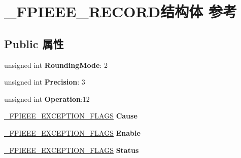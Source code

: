 \hypertarget{struct___f_p_i_e_e_e___r_e_c_o_r_d}{}\section{\+\_\+\+F\+P\+I\+E\+E\+E\+\_\+\+R\+E\+C\+O\+R\+D结构体 参考}
\label{struct___f_p_i_e_e_e___r_e_c_o_r_d}
\subsection*{Public 属性}
\begin{DoxyCompactItemize}
\item 
\mbox{\label{struct___f_p_i_e_e_e___r_e_c_o_r_d_ac12c23bab4db49dab0afd46d5b78eb63}} 
unsigned int {\bfseries Rounding\+Mode}\+: 2
\item 
\mbox{\label{struct___f_p_i_e_e_e___r_e_c_o_r_d_aa8602eb95392de3eef8529afe92adc11}} 
unsigned int {\bfseries Precision}\+: 3
\item 
\mbox{\label{struct___f_p_i_e_e_e___r_e_c_o_r_d_a68aa35a8f6b9ae86a5e7fadbfc94fd18}} 
unsigned int {\bfseries Operation}\+:12
\item 
\mbox{\label{struct___f_p_i_e_e_e___r_e_c_o_r_d_a7fb2b6cd1f353608a981978f2bc28376}} 
\hyperlink{struct___f_p_i_e_e_e___e_x_c_e_p_t_i_o_n___f_l_a_g_s}{\+\_\+\+F\+P\+I\+E\+E\+E\+\_\+\+E\+X\+C\+E\+P\+T\+I\+O\+N\+\_\+\+F\+L\+A\+GS} {\bfseries Cause}
\item 
\mbox{\label{struct___f_p_i_e_e_e___r_e_c_o_r_d_ac92edffdfbf0bc9b5ad390d6060c12f3}} 
\hyperlink{struct___f_p_i_e_e_e___e_x_c_e_p_t_i_o_n___f_l_a_g_s}{\+\_\+\+F\+P\+I\+E\+E\+E\+\_\+\+E\+X\+C\+E\+P\+T\+I\+O\+N\+\_\+\+F\+L\+A\+GS} {\bfseries Enable}
\item 
\mbox{\label{struct___f_p_i_e_e_e___r_e_c_o_r_d_a1dba3a6e3c64b7c8213d28e08989cdec}} 
\hyperlink{struct___f_p_i_e_e_e___e_x_c_e_p_t_i_o_n___f_l_a_g_s}{\+\_\+\+F\+P\+I\+E\+E\+E\+\_\+\+E\+X\+C\+E\+P\+T\+I\+O\+N\+\_\+\+F\+L\+A\+GS} {\bfseries Status}
\item 

\end{DoxyCompactItemize}
